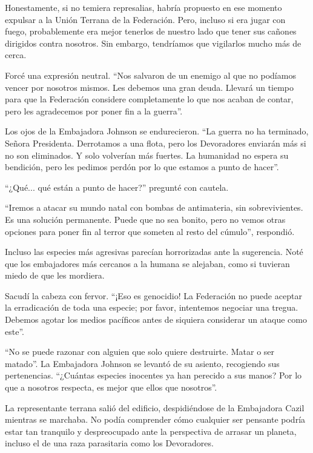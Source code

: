 \documentclass[spanish,12pt,a4paper,oneside,titlepage]{book}
\begin{document}
    Honestamente, si no temiera represalias, habría propuesto en ese momento expulsar a la Unión Terrana de la Federación. Pero, incluso si era jugar con fuego, probablemente era mejor tenerlos de nuestro lado que tener sus cañones dirigidos contra nosotros. Sin embargo, tendríamos que vigilarlos mucho más de cerca.

    Forcé una expresión neutral. ``Nos salvaron de un enemigo al que no podíamos vencer por nosotros mismos. Les debemos una gran deuda. Llevará un tiempo para que la Federación considere completamente lo que nos acaban de contar, pero les agradecemos por poner fin a la guerra''.

    Los ojos de la Embajadora Johnson se endurecieron. ``La guerra no ha terminado, Señora Presidenta. Derrotamos a una flota, pero los Devoradores enviarán más si no son eliminados. Y solo volverían más fuertes. La humanidad no espera su bendición, pero les pedimos perdón por lo que estamos a punto de hacer''.

    ``¿Qué... qué están a punto de hacer?'' pregunté con cautela.

    ``Iremos a atacar su mundo natal con bombas de antimateria, sin sobrevivientes. Es una solución permanente. Puede que no sea bonito, pero no vemos otras opciones para poner fin al terror que someten al resto del cúmulo'', respondió.

    Incluso las especies más agresivas parecían horrorizadas ante la sugerencia. Noté que los embajadores más cercanos a la humana se alejaban, como si tuvieran miedo de que les mordiera.

    Sacudí la cabeza con fervor. ``¡Eso es genocidio! La Federación no puede aceptar la erradicación de toda una especie; por favor, intentemos negociar una tregua. Debemos agotar los medios pacíficos antes de siquiera considerar un ataque como este''.

    ``No se puede razonar con alguien que solo quiere destruirte. Matar o ser matado''. La Embajadora Johnson se levantó de su asiento, recogiendo sus pertenencias. ``¿Cuántas especies inocentes ya han perecido a sus manos? Por lo que a nosotros respecta, es mejor que ellos que nosotros''.

    La representante terrana salió del edificio, despidiéndose de la Embajadora Cazil mientras se marchaba. No podía comprender cómo cualquier ser pensante podría estar tan tranquilo y despreocupado ante la perspectiva de arrasar un planeta, incluso el de una raza parasitaria como los Devoradores.
\end{document}
